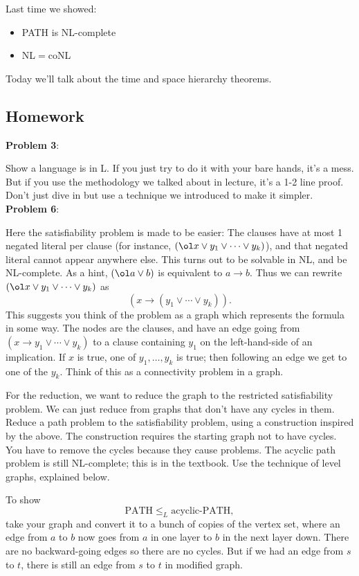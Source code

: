 
Last time we showed:
\begin{itemize}
\item
PATH is NL-complete
\item
NL$=$coNL
\end{itemize}

Today we'll talk about the time and space hierarchy theorems.

\subsection*{Homework}

\textbf{Problem 3}:

Show a language is in L. If you just try to do it with your bare hands, it's a mess. But if you use the methodology we talked about in lecture, it's a 1-2 line proof. Don't just dive in but use a technique we introduced to make it simpler. \\

\textbf{Problem 6}:

Here the satisfiability problem is made to be easier: The clauses have at most 1 negated literal per clause (for instance, $(\ol x\vee y_1\vee\cdots \vee y_k)$), and that negated literal cannot appear anywhere else. This turns out to be solvable in NL, and be NL-complete. As a hint, $(\ol a\vee b)$ is equivalent to $a\to b$. Thus we can rewrite $(\ol x\vee y_1\vee\cdots \vee y_k)$ as
\[
(x\to (y_1\vee\cdots \vee y_k)).
\]
This suggests you think of the problem as a graph which represents the formula in some way. The nodes are the clauses, and have an edge going from $(x\to y_1\vee \cdots\vee y_k)$ to a clause containing $y_1$ on the left-hand-side of an implication. If $x$ is true, one of $y_1,\ldots, y_k$ is true; then following an edge we get to one of the $y_k$. Think of this as a connectivity problem in a graph. 

For the reduction, we want to reduce the graph to the restricted satisfiability problem. We can just reduce from graphs that don't have any cycles in them. Reduce a path problem to the satisfiability problem, using a construction inspired by the above. The construction requires the starting graph not to have cycles. You have to remove the cycles because they cause problems.
The acyclic path problem is still NL-complete; this is in the textbook. Use the technique of level graphs, explained below. %

To show 
\[\text{PATH}\le_L\text{acyclic-PATH},\]
take your graph and convert it to a bunch of copies of the vertex set, where an edge from $a$ to $b$ now goes from $a$ in one layer to $b$ in the next layer down. There are no backward-going edges so there are no cycles. But if we had an edge from $s$ to $t$, there is still an edge from $s$ to $t$ in modified graph.

